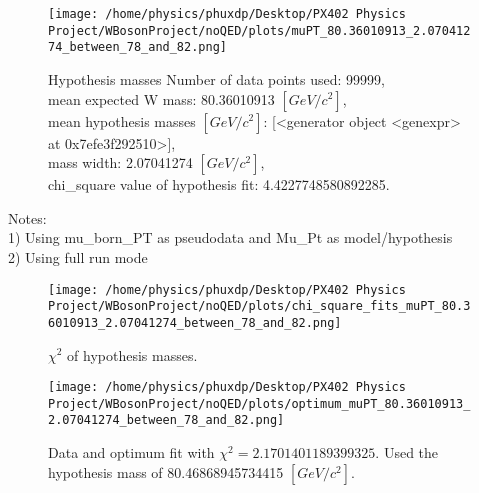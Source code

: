 \documentclass[12pt]{article}
\begin{document}
	\begin{figure}[tb]
		\centering
		\texttt{[image: /home/physics/phuxdp/Desktop/PX402 Physics Project/WBosonProject/noQED/plots/muPT\_80.36010913\_2.07041274\_between\_78\_and\_82.png]}
		\caption{\small Hypothesis masses Number of data points used: 99999,\\
mean expected W mass: 80.36010913 $[GeV/c^{2}]$,\\
mean hypothesis masses $[GeV/c^{2}]$: [<generator object <genexpr> at 0x7efe3f292510>],\\
mass width: 2.07041274 $[GeV/c^{2}]$,\\
chi_square value of hypothesis fit: 4.4227748580892285. }
		\label{fig: fig_0}
	\end{figure}
    Notes: \\
    1) Using mu\_born\_PT as pseudodata and  Mu\_Pt as model/hypothesis\\
    2) Using full run mode\\
       \begin{figure}[tb]
		\centering
		\texttt{[image: /home/physics/phuxdp/Desktop/PX402 Physics Project/WBosonProject/noQED/plots/chi\_square\_fits\_muPT\_80.36010913\_2.07041274\_between\_78\_and\_82.png]}
		\caption{\small $\chi^2$ of hypothesis masses. }
		\label{fig: fig_chi_square}
	\end{figure}

    \begin{figure}[tb]
		\centering
		\texttt{[image: /home/physics/phuxdp/Desktop/PX402 Physics Project/WBosonProject/noQED/plots/optimum\_muPT\_80.36010913\_2.07041274\_between\_78\_and\_82.png]}
		\caption{\small Data and optimum fit with $\chi^2 = 2.1701401189399325$. Used the hypothesis mass of 80.46868945734415 $[GeV/c^{2}]$. }
		\label{fig: fig_optim_parms}
	\end{figure}
    
\end{document}
